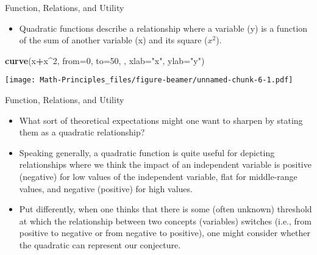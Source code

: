 \documentclass[
  ignorenonframetext,
]{beamer}
\newenvironment{Shaded}{\begin{snugshade}}{\end{snugshade}}
\newcommand{\DataTypeTok}[1]{\textcolor[rgb]{0.13,0.29,0.53}{#1}}
\newcommand{\DecValTok}[1]{\textcolor[rgb]{0.00,0.00,0.81}{#1}}
\newcommand{\KeywordTok}[1]{\textcolor[rgb]{0.13,0.29,0.53}{\textbf{#1}}}
\newcommand{\NormalTok}[1]{#1}
\newcommand{\OperatorTok}[1]{\textcolor[rgb]{0.81,0.36,0.00}{\textbf{#1}}}
\newcommand{\StringTok}[1]{\textcolor[rgb]{0.31,0.60,0.02}{#1}}
\providecommand{\tightlist}{%
  \setlength{\itemsep}{0pt}\setlength{\parskip}{0pt}}
\begin{document}
\begin{frame}[fragile]{Function, Relations, and Utility}
\protect\hypertarget{function-relations-and-utility-15}{}

\begin{itemize}
\tightlist
\item
  Quadratic functions describe a relationship where a variable (y) is a
  function of the sum of another variable (x) and its square
  (\(x^{2}\)).
\end{itemize}

\begin{Shaded}
\begin{Highlighting}[]
\KeywordTok{curve}\NormalTok{(x}\OperatorTok{+}\NormalTok{x}\OperatorTok{^}\DecValTok{2}\NormalTok{, }\DataTypeTok{from=}\DecValTok{0}\NormalTok{, }\DataTypeTok{to=}\DecValTok{50}\NormalTok{, , }\DataTypeTok{xlab=}\StringTok{"x"}\NormalTok{, }\DataTypeTok{ylab=}\StringTok{"y"}\NormalTok{)}
\end{Highlighting}
\end{Shaded}

\texttt{[image: Math-Principles\_files/figure-beamer/unnamed-chunk-6-1.pdf]}

\end{frame}

\begin{frame}{Function, Relations, and Utility}
\protect\hypertarget{function-relations-and-utility-16}{}

\begin{itemize}
\item
  What sort of theoretical expectations might one want to sharpen by
  stating them as a quadratic relationship?
\item
  Speaking generally, a quadratic function is quite useful for depicting
  relationships where we think the impact of an independent variable is
  positive (negative) for low values of the independent variable, flat
  for middle-range values, and negative (positive) for high values.
\item
  Put differently, when one thinks that there is some (often unknown)
  threshold at which the relationship between two concepts (variables)
  switches (i.e., from positive to negative or from negative to
  positive), one might consider whether the quadratic can represent our
  conjecture.
\end{itemize}

\end{frame}
\end{document}
